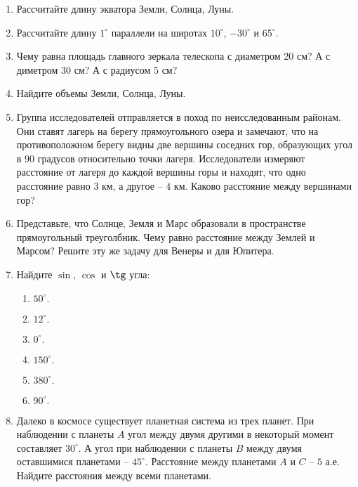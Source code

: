 \documentclass[12pt]{article}
\begin{document}
\begin{enumerate}
    \item Рассчитайте длину экватора Земли, Солнца, Луны.
    \item Рассчитайте длину $1^{\circ}$ параллели на широтах $10^{\circ}$, $-30^{\circ}$ и $65^{\circ}$.
    \item Чему равна площадь главного зеркала телескопа с диаметром $20$ см? А с диметром $30$ см? А с радиусом $5$ см?
    \item Найдите объемы Земли, Солнца, Луны.
    \item Группа исследователей отправляется в поход по неисследованным районам. Они ставят лагерь на берегу прямоугольного озера и замечают, что на противоположном берегу видны две вершины соседних гор, образующих угол в $90$ градусов относительно точки лагеря. Исследователи измеряют расстояние от лагеря до каждой вершины горы и находят, что одно расстояние равно $3$ км, а другое -- $4$ км. Каково расстояние между вершинами гор?
    \item Представьте, что Солнце, Земля и Марс образовали в пространстве прямоугольный треуголбник. Чему равно расстояние между Землей и Марсом? Решите эту же задачу для Венеры и для Юпитера.
    \item Найдите $\sin$, $\cos$ и $\tg$ угла:
    \begin{multicols}{2}
		\begin{enumerate}[label=\textbf{\Alph*.}]
			\item{
                $50^{\circ}.$
            } \item{
                $12^{\circ}.$
            } \item{
                $0^{\circ}.$
            }
			\item{
                $150^{\circ}.$
            } \item{
                $380^{\circ}.$
            } \item{
                $90^{\circ}.$
            }
		\end{enumerate}
	\end{multicols}

    \item Далеко в космосе существует планетная система из трех планет. При наблюдении с планеты $A$ угол между двумя другими в некоторый момент составляет $30^{\circ}$. А угол при наблюдении с планеты $B$ между двумя оставшимися планетами -- $45^{\circ}$. Расстояние между планетами $A$ и $C$ -- $5$ а.е. Найдите расстояния между всеми планетами.

 \end{enumerate}
\end{document}
